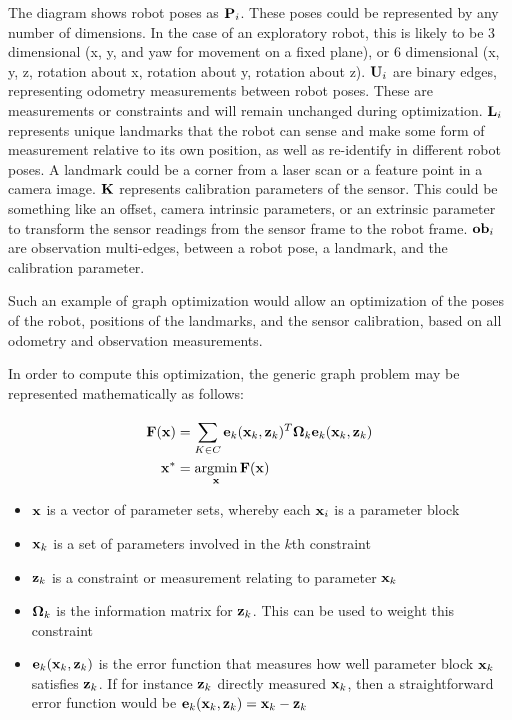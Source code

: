 The diagram shows robot poses as $\mathbf P_i$.  These poses could be represented by any number of dimensions. In the case of an exploratory robot, this is likely to be 3 dimensional (x, y, and yaw for movement on a fixed plane), or 6 dimensional (x, y, z, rotation about x, rotation about y, rotation about z).  $\mathbf U_i$ are binary edges, representing odometry measurements between robot poses. These are measurements or constraints and will remain unchanged during optimization.  
$\mathbf L_i$ represents unique landmarks that the robot can sense and make some form of measurement relative to its own position, as well as re-identify in different robot poses.  A landmark could be a corner from a laser scan or a feature point in a camera image.  $\mathbf K$ represents calibration parameters of the sensor.  This could be something like an offset, camera intrinsic parameters, or an extrinsic parameter to transform the sensor readings from the sensor frame to the robot frame.  $\mathbf {ob}_i$ are observation multi-edges, between a robot pose, a landmark, and the calibration parameter.

Such an example of graph optimization would allow an optimization of the poses of the robot, positions of the landmarks, and the sensor calibration, based on all odometry and observation measurements.

In order to compute this optimization, the generic graph problem may be represented mathematically as follows:

 \begin{align}
   \bv{F}(\bv x) &= \sum\limits_{K \in C}^{} 
                 \bv e_k(\bv x_k, \bv z_k)^T 
                 \bv \Omega_k
                 \bv e_k(\bv x_k, \bv z_k)  \\ 
   \bv x^* &= \operatornamewithlimits{argmin}\limits_{\bv x}\bv{F}(\bv x)
 \end{align}

\begin{itemize}
 \item $\mathbf x$ is a vector of parameter sets, whereby each $\mathbf x_i$ is a parameter block
 \item $\mathbf x_k$ is a set of parameters involved in the $k$th constraint
 \item $\mathbf z_k$ is a constraint or measurement relating to parameter $\mathbf x_k$
 \item $\mathbf \Omega_k$ is the information matrix for $\mathbf z_k$.  This can be used to weight this constraint
 \item $\mathbf e_k(\mathbf x_k, \mathbf z_k)$ is the error function that measures how well parameter block $\mathbf x_k$ satisfies $\mathbf z_k$.  If for instance $\mathbf z_k$ directly measured $\mathbf x_k$, then a straightforward error function would be $\mathbf e_k(\mathbf x_k, \mathbf z_k) = \mathbf x_k - \mathbf z_k $
\end{itemize}

